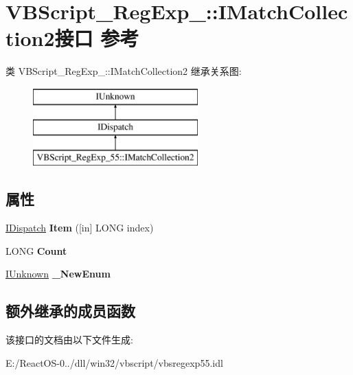 \hypertarget{interface_v_b_script___reg_exp__55_1_1_i_match_collection2}{}\section{V\+B\+Script\+\_\+\+Reg\+Exp\+\_\+:\+:I\+Match\+Collection2接口 参考}
\label{interface_v_b_script___reg_exp__55_1_1_i_match_collection2}
类 V\+B\+Script\+\_\+\+Reg\+Exp\+\_\+:\+:I\+Match\+Collection2 继承关系图\+:\begin{figure}[H]
\begin{center}
\leavevmode
\includegraphics[height=3.000000cm]{interface_v_b_script___reg_exp__55_1_1_i_match_collection2}
\end{center}
\end{figure}
\subsection*{属性}
\begin{DoxyCompactItemize}
\item 
\mbox{\label{interface_v_b_script___reg_exp__55_1_1_i_match_collection2_a19291acc425dc84f007f1da01e072eef}} 
\hyperlink{interface_i_dispatch}{I\+Dispatch} {\bfseries Item} (\mbox{[}in\mbox{]} L\+O\+NG index)
\item 
\mbox{\label{interface_v_b_script___reg_exp__55_1_1_i_match_collection2_a894f80130f6ffc93fc3a7fbd0818cd6d}} 
L\+O\+NG {\bfseries Count}
\item 
\mbox{\label{interface_v_b_script___reg_exp__55_1_1_i_match_collection2_a36e9ee65a60b1286b3b57ba258c1c7fe}} 
\hyperlink{interface_i_unknown}{I\+Unknown} {\bfseries \+\_\+\+New\+Enum}
\end{DoxyCompactItemize}
\subsection*{额外继承的成员函数}


该接口的文档由以下文件生成\+:\begin{DoxyCompactItemize}
\item 
E\+:/\+React\+O\+S-\/0../dll/win32/vbscript/vbsregexp55.\+idl\end{DoxyCompactItemize}
